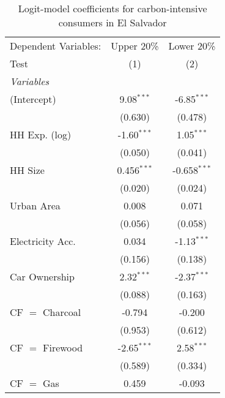 
\begin{table}[htbp!]
   \centering
   \small
   \begin{adjustbox}{width = 1\textwidth, max height = 0.95\textheight, center}
      \begin{threeparttable}[b]
         \caption{\label{tab:Logit_1_SLV} Logit-model coefficients for carbon-intensive consumers in El Salvador}
         \begin{tabular}{lcc}
            \tabularnewline \midrule \midrule
            Dependent Variables: & Upper 20\%    & Lower 20\%\\   
            Test                 & (1)           & (2)\\  
            \midrule
            \emph{Variables}\\
            (Intercept)          & 9.08$^{***}$  & -6.85$^{***}$\\   
                                 & (0.630)       & (0.478)\\   
            HH Exp. (log)        & -1.60$^{***}$ & 1.05$^{***}$\\   
                                 & (0.050)       & (0.041)\\   
            HH Size              & 0.456$^{***}$ & -0.658$^{***}$\\   
                                 & (0.020)       & (0.024)\\   
            Urban Area           & 0.008         & 0.071\\   
                                 & (0.056)       & (0.058)\\   
            Electricity Acc.     & 0.034         & -1.13$^{***}$\\   
                                 & (0.156)       & (0.138)\\   
            Car Ownership        & 2.32$^{***}$  & -2.37$^{***}$\\   
                                 & (0.088)       & (0.163)\\   
            CF $=$ Charcoal      & -0.794        & -0.200\\   
                                 & (0.953)       & (0.612)\\   
            CF $=$ Firewood      & -2.65$^{***}$ & 2.58$^{***}$\\   
                                 & (0.589)       & (0.334)\\   
            CF $=$ Gas           & 0.459         & -0.093\\   

\end{tabular}
\end{threeparttable}
\end{adjustbox}
\end{table}
